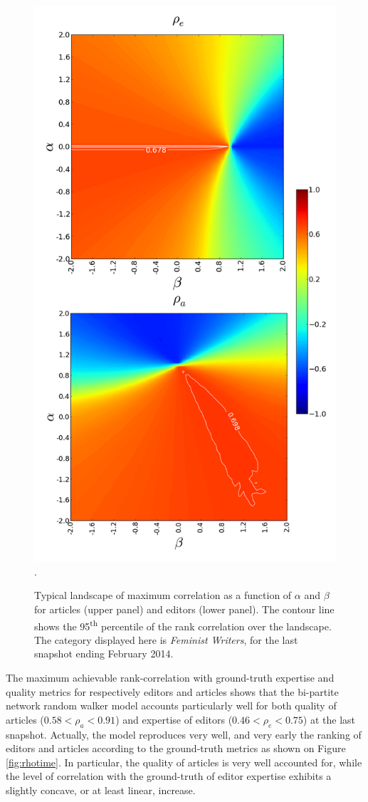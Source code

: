 \begin{figure}[!t]
\centering
\includegraphics[width=0.9\columnwidth]{../Figures/contour_fem_combined.png}.
\caption{Typical landscape of maximum correlation as a function of $\alpha$ and $\beta$ for articles (upper panel) and editors (lower panel). The contour line shows the 95\textsuperscript{th} percentile of the rank correlation over the landscape. The category displayed here is {\it Feminist Writers}, for the last snapshot ending February 2014.}
\label{fig:landscape}
\end{figure}

The maximum achievable rank-correlation with ground-truth expertise and quality metrics for respectively editors \cite{geiger2013} and articles \cite{wang2013tell} shows that the bi-partite network random walker model accounts particularly well for both quality of articles ($0.58 < \rho_a < 0.91$) and expertise of editors ($0.46 < \rho_e < 0.75 $) at the last snapshot. Actually, the model reproduces very well, and very early the ranking of editors and articles according to the ground-truth metrics as shown on Figure \ref{fig:rhotime}. In particular, the quality of articles is very well accounted for, while the level of correlation with the ground-truth of editor expertise exhibits a slightly concave, or at least linear, increase.

